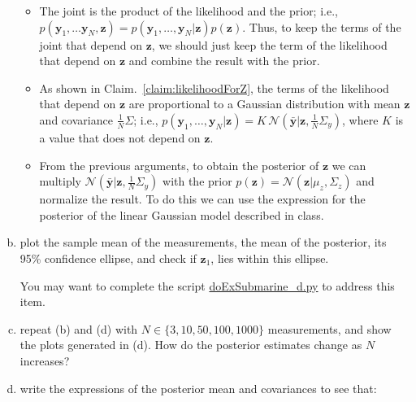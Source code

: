 \documentclass[12pt]{article}
\begin{document}
\begin{enumerate}[(a)]
\begin{itemize}
            \item The joint is the product of the likelihood and the prior;
                i.e.,
                $p(\mathbf{y}_1,\ldots\mathbf{y}_N,\mathbf{z})=p(\mathbf{y}_1,\ldots,\mathbf{y}_N|\mathbf{z})p(\mathbf{z})$.
                Thus, to keep the terms of the joint that depend on
                $\mathbf{z}$, we should just keep the term of the
                likelihood that depend on $\mathbf{z}$ and combine the
                result with the prior.

            \item As shown in Claim.~\ref{claim:likelihoodForZ}, the terms of the
                likelihood that depend on $\mathbf{z}$ are proportional to
                a Gaussian distribution with mean $\mathbf{z}$ and
                covariance $\frac{1}{N}\Sigma$; i.e., 
                $p(\mathbf{y}_1,\ldots,\mathbf{y}_N|\mathbf{z})=K\,\mathcal{N}(\bar{\mathbf{y}}|\mathbf{z},\frac{1}{N}\Sigma_y)$,
                where $K$ is a value that does not depend on $\mathbf{z}$.

            \item From the previous arguments, to obtain the posterior of
                $\mathbf{z}$ we can multiply
                $\mathcal{N}(\bar{\mathbf{y}}|\mathbf{z},\frac{1}{N}\Sigma_y)$
                with the prior
                $p(\mathbf{z})=\mathcal{N}(\mathbf{z}|\mu_z,\Sigma_z)$ and
                normalize the result. To do this we can use the expression
                for the posterior of the linear Gaussian model described in
                class.

        \end{itemize}

    \item plot the sample mean of the measurements, the mean of the posterior,
        its 95\% confidence ellipse, and check if $\mathbf{z}_1$, lies within
        this ellipse.

        You may want to complete the script
        \href{http://github.com/joacorapela/gcnu\_bridging2023}{doExSubmarine\_d.py}
        to address this item.

    \item repeat (b) and (d) with $N\in\{3,10,50,100,1000\}$ measurements, and
        show the plots generated in (d).  How do the posterior estimates change
        as $N$ increases?

    \item write the expressions of the posterior mean and covariances to
        see that:


\end{enumerate}
\end{document}
